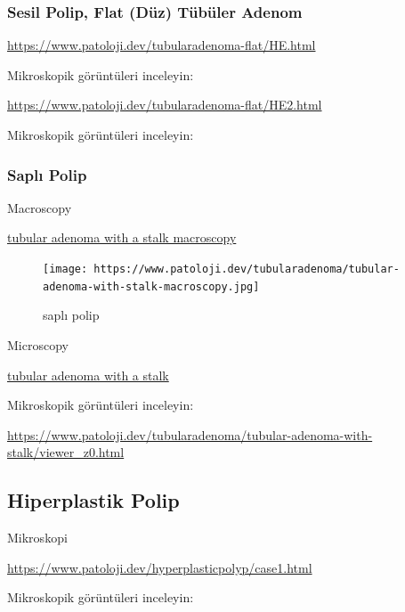 \documentclass[
  letterpaper,
  DIV=11,
  numbers=noendperiod]{scrreprt}
\begin{document}
\hypertarget{sesil-polip-flat-duxfcz-tuxfcbuxfcler-adenom-1}{%
\subsubsection{Sesil Polip, Flat (Düz) Tübüler
Adenom}\label{sesil-polip-flat-duxfcz-tuxfcbuxfcler-adenom-1}}

\url{https://www.patoloji.dev/tubularadenoma-flat/HE.html}

Mikroskopik görüntüleri inceleyin:

\url{https://www.patoloji.dev/tubularadenoma-flat/HE2.html}

Mikroskopik görüntüleri inceleyin:

\hypertarget{saplux131-polip-1}{%
\subsubsection{Saplı Polip}\label{saplux131-polip-1}}

Macroscopy

\href{https://www.patoloji.dev/tubularadenoma/tubular-adenoma-with-stalk-macroscopy.jpg}{tubular
adenoma with a stalk macroscopy}

\begin{figure}

{\centering \texttt{[image: https://www.patoloji.dev/tubularadenoma/tubular-adenoma-with-stalk-macroscopy.jpg]}

}

\caption{saplı polip}

\end{figure}

Microscopy

\href{https://www.patoloji.dev/tubularadenoma/tubular-adenoma-with-stalk.jpeg}{tubular
adenoma with a stalk}

Mikroskopik görüntüleri inceleyin:

\url{https://www.patoloji.dev/tubularadenoma/tubular-adenoma-with-stalk/viewer_z0.html}

\hypertarget{hiperplastik-polip}{%
\subsection{Hiperplastik Polip}\label{hiperplastik-polip}}

Mikroskopi

\url{https://www.patoloji.dev/hyperplasticpolyp/case1.html}

Mikroskopik görüntüleri inceleyin:
\end{document}
